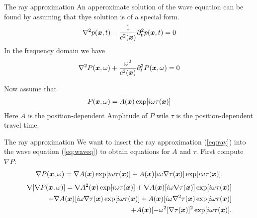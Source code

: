 \documentclass[xcolor=dvipsnames,notes]{beamer}
\begin{document}
\begin{frame}{The ray approximation}
An apperoximate solution of the wave equation can be
found by assuming that thye solution is of a special form.
%
\begin{eqnarray}
\nabla^2 p(\mbox{\boldmath $x$},t) - \frac{1}{c^2(\mbox{\boldmath $x$})}\partial^2_t p(\mbox{\boldmath $x$},t) = 0
\end{eqnarray}
%
In the frequency domain we have
\begin{eqnarray}
\nabla^2 P(\mbox{\boldmath $x$},\omega) + \frac{\omega^2}{c^2(\mbox{\boldmath $x$})}\partial^2_t P(\mbox{\boldmath $x$},\omega) = 0
                                 \label{eq:waveq}
\end{eqnarray}

Now assume that
\begin{eqnarray}
  P(\mbox{\boldmath $x$},\omega) = A(\mbox{\boldmath $x$})\exp[i\omega\tau(\mbox{\boldmath $x$})]
                      \label{eq:ray}
\end{eqnarray}  
Here $A$ is the position-dependent Amplitude of $P$ 
wile $\tau$ is the position-dependent travel time.
\end{frame}
\begin{frame}{The ray approximation}
We want to insert the ray approximation (\eqref{eq:ray}) into
the wave equation (\eqref{eq:waveq}) to obtain equations for $A$ and $\tau$.
First compute $\nabla P$:
\begin{eqnarray}
\nabla P(\mbox{\boldmath $x$},\omega) = \nabla A(\mbox{\boldmath $x$})\exp[i\omega\tau(\mbox{\boldmath $x$})] 
		       + A(\mbox{\boldmath $x$})[i\omega\nabla\tau(\mbox{\boldmath $x$})]\exp[i\omega\tau(\mbox{\boldmath $x$})].
\end{eqnarray}
\begin{eqnarray}
\nabla[\nabla P(\mbox{\boldmath $x$},\omega)] = \nabla A^2(\mbox{\boldmath $x$})\exp[i\omega\tau(\mbox{\boldmath $x$})] 
                             + \nabla A(\mbox{\boldmath $x$})[i\omega\nabla\tau(\mbox{\boldmath $x$})]\exp[i\omega\tau(\mbox{\boldmath $x$})] \nonumber\\
                             + \nabla A(\mbox{\boldmath $x$})[i\omega\nabla\tau(\mbox{\boldmath $x$})\exp[i\omega\tau(\mbox{\boldmath $x$})] 
                             + A(\mbox{\boldmath $x$})[i\omega\nabla^2\tau(\mbox{\boldmath $x$})\exp[i\omega\tau(\mbox{\boldmath $x$})]       \nonumber \\
                             + A(\mbox{\boldmath $x$})[-\omega^2[\nabla\tau(\mbox{\boldmath $x$})]^2\exp[i\omega\tau(\mbox{\boldmath $x$})].
\end{eqnarray}
\end{frame}
\end{document}
